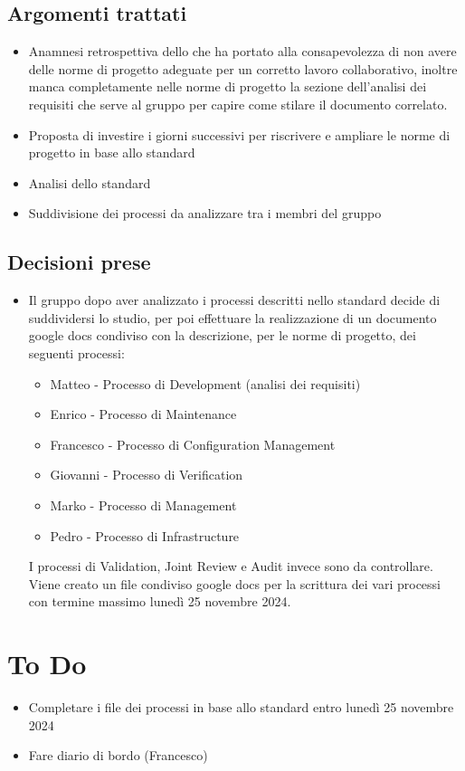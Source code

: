 \documentclass[a4paper, 12pt]{article}
\begin{document}
\subsection{Argomenti trattati}
\begin{itemize}
    \item Anamnesi retrospettiva dello  che ha portato alla consapevolezza di non avere delle norme di progetto adeguate per un corretto lavoro collaborativo, inoltre manca completamente nelle norme di progetto la sezione dell'analisi dei requisiti che serve al gruppo per capire come stilare il documento correlato.
    \item Proposta di investire i giorni successivi per riscrivere e ampliare le norme di progetto in base allo standard 
    \item Analisi dello standard 
    \item Suddivisione dei processi da analizzare tra i membri del gruppo
\end{itemize}

\subsection{Decisioni prese}
\begin{itemize}
    \item Il gruppo dopo aver analizzato i processi descritti nello standard  decide di suddividersi lo studio, per poi effettuare la realizzazione di un documento google docs condiviso con la descrizione, per le norme di progetto, dei seguenti processi:
    \begin{itemize}
        \item Matteo - Processo di Development (analisi dei requisiti)
        \item Enrico - Processo di Maintenance
        \item Francesco - Processo di Configuration Management
        \item Giovanni - Processo di Verification
        \item Marko - Processo di Management
        \item Pedro - Processo di Infrastructure
    \end{itemize}
    I processi di Validation, Joint Review e Audit invece sono da controllare.
    Viene creato un file condiviso google docs per la scrittura dei vari processi con termine massimo lunedì 25 novembre 2024.
\end{itemize}

\section{To Do}
    \begin{itemize}
        \item Completare i file dei processi in base allo standard  entro lunedì 25 novembre 2024
        \item Fare diario di bordo (Francesco)
    \end{itemize}
\end{document}
